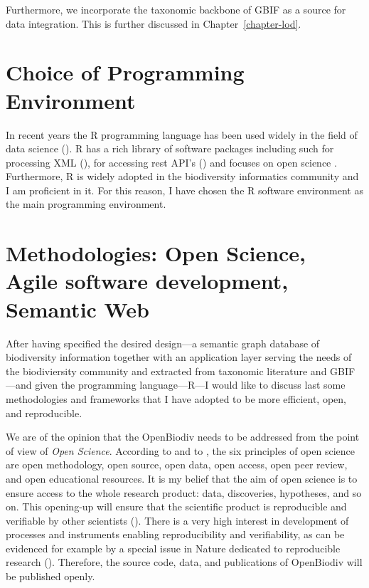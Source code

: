 Furthermore, we incorporate the taxonomic backbone of GBIF \cite{gbif_secretariat_gbif_2017} as a source for data integration. This is further discussed in Chapter~\ref{chapter-lod}.

\section{Choice of Programming Environment}

In recent years the R programming language has been used widely in the field of data science (\cite{r_core_team_r:_2016}). R has a rich library of software packages including such for processing XML (\cite{wickham_xml2:_2018}), for accessing rest API's (\cite{wickham_httr:_2017}) and focuses on open science \cite{boettiger_building_2015}. Furthermore, R is widely adopted in the biodiversity informatics community and I am proficient in it. For this reason, I have chosen the R software environment as the main programming environment.

\section{Methodologies: Open Science, Agile software development, Semantic Web}

After having specified the desired design---a semantic graph database of biodiversity information together with an application layer serving the needs of the biodiviersity community and extracted from taxonomic literature and GBIF---and given the programming language---R---I would like to discuss last some methodologies and frameworks that I have adopted to be more efficient, open, and reproducible.

We are of the opinion that the OpenBiodiv needs to be addressed from the point of view of \emph{Open Science}. According to \cite{kraker_case_2011} and to \cite{noauthor_was_nodate}, the six principles of open science are open methodology, open source, open data, open access, open peer review, and open educational resources. It is my belief that the aim of open science is to ensure access to the whole research product: data, discoveries, hypotheses, and so on. This opening-up will ensure that the scientific product is reproducible and verifiable by other scientists (\cite{mietchen_transformative_2014}). There is a very high interest in development of processes and instruments enabling reproducibility and verifiability, as can be evidenced for example by a special issue in Nature dedicated to reproducible research (\cite{noauthor_challenges_2010}). Therefore, the source code, data, and publications of OpenBiodiv will be published openly.

